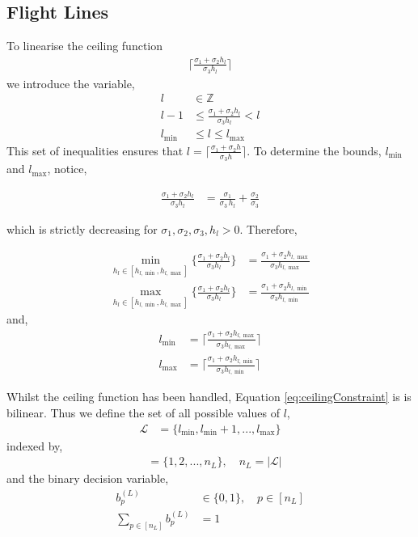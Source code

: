\documentclass[11pt]{article}
\begin{document}
\subsection{Flight Lines}
To linearise the ceiling function 
\begin{align}
  \lceil\frac{\sigma_1 + \sigma_2h_l}{\sigma_3h_l}\rceil
\end{align} 
we introduce the variable,
\begin{align}
  l &\in \mathbb{Z}\\
  l-1 &\leq \frac{\sigma_1 + \sigma_2h_l}{\sigma_3h_l} < l \label{eq:ceilingConstraint}\\
  l_{\min} &\leq l \leq l_{\max}
\end{align}
This set of inequalities ensures that $l = \lceil\frac{\sigma_1 + \sigma_2h}{\sigma_3h}\rceil$. To determine the bounds, $l_{\min}$ and $l_{\max}$, notice,

\begin{align}
  \frac{\sigma_1 + \sigma_2h_l}{\sigma_3h_l} &= \frac{\sigma_{1}}{\sigma_{3}\,h_l} + \frac{\sigma_{2}}{\sigma_{3}}
\end{align}

which is strictly decreasing for $\sigma_1,\sigma_2,\sigma_3,h_l > 0$. Therefore,

\begin{align}
  \min_{h_l \in [h_{l,\min},h_{l,\max}]}\{\frac{\sigma_1 + \sigma_2h_l}{\sigma_3h_l}\} &= \frac{\sigma_1 + \sigma_2h_{l,\max}}{\sigma_3h_{l,\max}}\\
  \max_{h_l \in [h_{l,\min},h_{l,\max}]}\{\frac{\sigma_1 + \sigma_2h_l}{\sigma_3h_l}\} &= \frac{\sigma_1 + \sigma_2h_{l,\min}}{\sigma_3h_{l,\min}}
\end{align}
and,
\begin{align}
  l_{\min} &= \lceil \frac{\sigma_1 + \sigma_2h_{l,\max}}{\sigma_3h_{l,\max}}\rceil\\
  l_{\max} &= \lceil \frac{\sigma_1 + \sigma_2h_{l,\min}}{\sigma_3h_{l,\min}}\rceil
\end{align}

Whilst the ceiling function has been handled, Equation \ref{eq:ceilingConstraint} is is bilinear. Thus we define the set of all possible values of $l$,
\begin{align}
  \mathcal{L} &= \{l_{\min}, l_{\min} + 1, ..., l_{\max}\}
\end{align}
indexed by,
\begin{align}
  [n_L] &= \{1,2,...,n_L\}, \quad n_L = |\mathcal{L}|
\end{align}
and the binary decision variable,
\begin{align}
  b_p^{(L)} &\in \{0,1\}, \quad p \in [n_L]\\
  \sum_{p \in [n_L]} b_p^{(L)} &= 1\\
\end{align}
\end{document}
